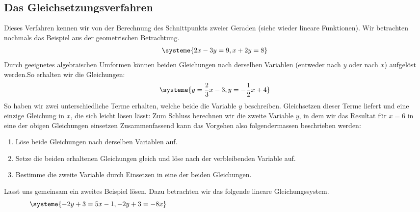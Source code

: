 \documentclass[11pt,oneside]{article}
\begin{document}
\subsection{Das Gleichsetzungsverfahren}
	Dieses Verfahren kennen wir von der Berechnung des Schnittpunkts zweier Geraden (siehe wieder \flqq lineare Funktionen\frqq).
	Wir betrachten nochmals das Beispiel aus der geometrischen Betrachtung.
	\begin{align*}
		\systeme{2x-3y=9,x+2y=8}
	\end{align*}
	Durch geeignetes algebraischen Umformen können beiden Gleichungen nach derselben Variablen (entweder nach $y$ oder nach $x$) aufgelöst werden.So erhalten wir die Gleichungen:
	\begin{align*}
		\systeme{y=\frac{2}{3}x-3, y=-\frac{1}{2}x+4}
	\end{align*}
	So haben wir zwei unterschiedliche Terme erhalten, welche beide die Variable $y$ beschreiben. Gleichsetzen dieser Terme liefert und eine einzige Gleichung in $x$, die sich leicht lösen lässt: \vspace*{5pt}\newline{}
	Zum Schluss berechnen wir die zweite Variable $y$, in dem wir das Resultat für $x=6$ in eine der obigen Gleichungen einsetzen\vspace*{5pt}\newline{}
	Zusammenfassend kann das Vorgehen also folgendermassen beschrieben werden:
	\begin{algo}[Gleichsetzungsverfahren]
		\begin{enumerate}[label=\Roman*)]
			\item Löse beide Gleichungen nach derselben Variablen auf.
			\item Setze die beiden erhaltenen Gleichungen gleich und löse nach der verbleibenden Variable auf.
			\item Bestimme die zweite Variable durch Einsetzen in eine der beiden Gleichungen.
		\end{enumerate}
	\end{algo}
	\begin{beispiel}
		Lasst uns gemeinsam ein zweites Beispiel lösen. Dazu betrachten wir das folgende lineare Gleichungssystem.
		\[\systeme{-2y+3=5x-1,-2y+3=-8x}\hspace*{12cm}\]
	\end{beispiel}
\end{document}
